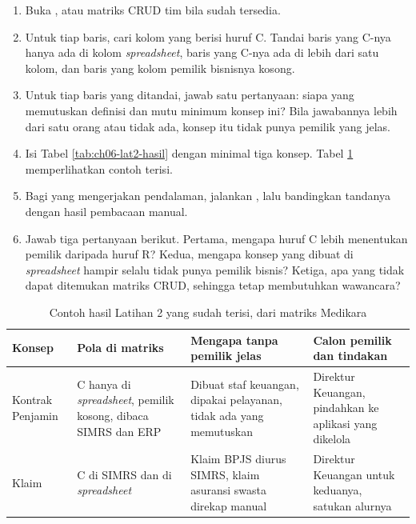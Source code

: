 \begin{enumerate}
  \item Buka , atau matriks
        CRUD tim bila sudah tersedia.
  \item Untuk tiap baris, cari kolom yang berisi huruf C. Tandai baris yang C-nya
        hanya ada di kolom \textit{spreadsheet}, baris yang C-nya ada di lebih
        dari satu kolom, dan baris yang kolom pemilik bisnisnya kosong.
  \item Untuk tiap baris yang ditandai, jawab satu pertanyaan: siapa yang
        memutuskan definisi dan mutu minimum konsep ini? Bila jawabannya lebih
        dari satu orang atau tidak ada, konsep itu tidak punya pemilik yang
        jelas.
  \item Isi Tabel \ref{tab:ch06-lat2-hasil} dengan minimal tiga konsep. Tabel
        \ref{tab:ch06-lat2-contoh} memperlihatkan contoh terisi.
  \item Bagi yang mengerjakan pendalaman, jalankan
        , lalu bandingkan
        tandanya dengan hasil pembacaan manual.
  \item Jawab tiga pertanyaan berikut. Pertama, mengapa huruf C lebih
        menentukan pemilik daripada huruf R? Kedua, mengapa konsep yang dibuat
        di \textit{spreadsheet} hampir selalu tidak punya pemilik bisnis?
        Ketiga, apa yang tidak dapat ditemukan matriks CRUD, sehingga tetap
        membutuhkan wawancara?
\end{enumerate}

\begin{table}[!htb]
  \centering
  \caption{Contoh hasil Latihan 2 yang sudah terisi, dari matriks Medikara}
  \label{tab:ch06-lat2-contoh}
  \begin{tabularx}{\textwidth}{lXXX}
    \hline
    \textbf{Konsep} & \textbf{Pola di matriks} & \textbf{Mengapa tanpa pemilik
      jelas} & \textbf{Calon pemilik dan tindakan} \\
    \hline
    Kontrak Penjamin & C hanya di \textit{spreadsheet}, pemilik kosong, dibaca
      SIMRS dan ERP & Dibuat staf keuangan, dipakai pelayanan, tidak ada yang
      memutuskan & Direktur Keuangan, pindahkan ke aplikasi yang dikelola \\
    \hline
    Klaim & C di SIMRS dan di \textit{spreadsheet} & Klaim BPJS diurus SIMRS,
      klaim asuransi swasta direkap manual & Direktur Keuangan untuk keduanya,
      satukan alurnya \\
    \hline
  \end{tabularx}
\end{table}

